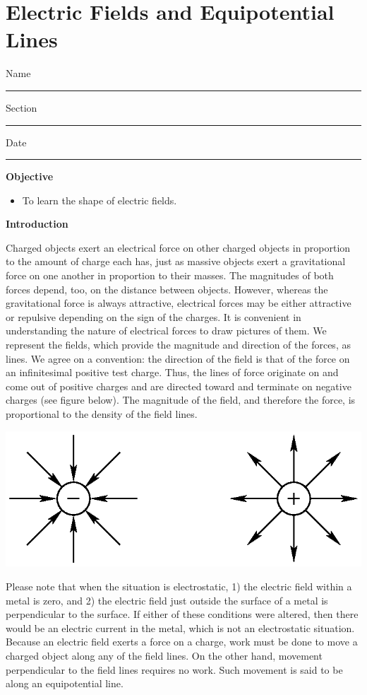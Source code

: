 
\section{Electric Fields and Equipotential Lines}

Name \rule{2.0in}{0.1pt}\hfill{}Section \rule{1.0in}{0.1pt}\hfill{}Date
\rule{1.0in}{0.1pt}

\textbf{Objective}

\begin{itemize}
\item To learn the shape of electric fields.
\end{itemize}
\textbf{Introduction}

Charged objects exert an electrical force on other charged objects
in proportion to the amount of charge each has, just as massive objects
exert a gravitational force on one another in proportion to their
masses. The magnitudes of both forces depend, too, on the distance
between objects. However, whereas the gravitational force is always
attractive, electrical forces may be either attractive or repulsive
depending on the sign of the charges. It is convenient in understanding
the nature of electrical forces to draw pictures of them. We represent
the fields, which provide the magnitude and direction of the forces,
as lines. We agree on a convention: the direction of the field is
that of the force on an infinitesimal positive test charge. Thus,
the lines of force originate on and come out of positive charges and
are directed toward and terminate on negative charges (see figure
below). The magnitude of the field, and therefore the force, is proportional
to the density of the field lines.

\vspace{0.3cm}
{\centering \includegraphics{electric_fields_and_equipotential_lines/ef_equipot_lines_fig_1.eps} \par}
\vspace{0.3cm}

Please note that when the situation is electrostatic, 1) the electric
field within a metal is zero, and 2) the electric field just outside
the surface of a metal is perpendicular to the surface. If either
of these conditions were altered, then there would be an electric
current in the metal, which is not an electrostatic situation. Because
an electric field exerts a force on a charge, work must be done to move a
charged object along any of the field lines. On the other hand, movement
perpendicular to the field lines requires no work. Such movement is
said to be along an equipotential line.


